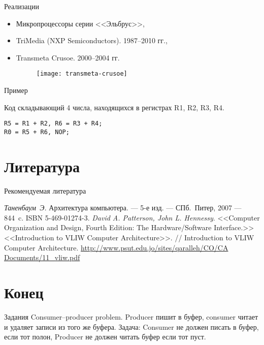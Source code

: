 \begin{frame}{Реализации}
\begin{itemize}
    \item Микропроцессоры серии <<Эльбрус>>,
    \item TriMedia (NXP Semiconductors). 1987--2010 гг.,
    \item Transmeta Crusoe. 2000--2004 гг.
    \begin{figure}[htbp]
        \texttt{[image: transmeta-crusoe]}
    \end{figure}
\end{itemize}
\end{frame}

\begin{frame}[fragile]{Пример}

Код складывающий 4 числа, находящихся в регистрах R1, R2, R3, R4.

\begin{lstlisting}
R5 = R1 + R2, R6 = R3 + R4;
R0 = R5 + R6, NOP;
\end{lstlisting}

\end{frame}

\section*{Литература}

\begin{frame}[allowframebreaks]{Рекомендуемая литература}
\begin{thebibliography}{99}
    \bibitem{} \textit{Таненбаум~Э.} Архитектура компьютера. --- 5-е изд. --- СПб.~Питер, 2007 --- 844~c. ISBN 5-469-01274-3.
     \textit{David A. Patterson, John L. Hennessy}. <<Computer Organization and Design, Fourth Edition: The Hardware/Software Interface.>>
     <<Introduction to VLIW Computer Architecture>>. // Introduction to VLIW Computer Architecture. \url{http://www.psut.edu.jo/sites/qaralleh/CO/CA Documents/11_vliw.pdf}
\end{thebibliography}
\end{frame}

\section*{Конец}

\ifsbertech
\begin{frame}{Задания}
Consumer--producer problem.
\vfill
Producer пишит в буфер, consumer читает и удаляет записи из того же буфера.
\vfill
Задача: Consumer не должен писать в буфер, если тот полон, Producer не должен
читать буфер если тот пуст.
\end{frame}
\fi

